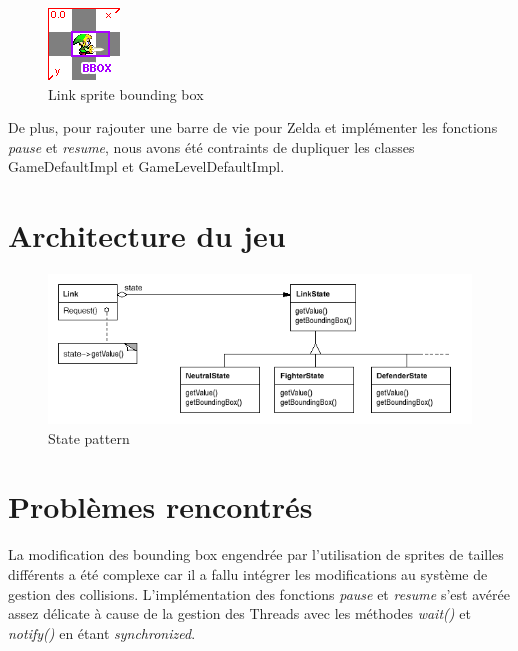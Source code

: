 \begin{figure}[ht!]
  \center
  \includegraphics{resources/bbox.png}
  \caption{Link sprite bounding box}
  \label{fig:Link sprite bounding box}
\end{figure}

De plus, pour rajouter une barre de vie pour Zelda et implémenter les fonctions
\emph{pause} et \emph{resume}, nous avons été contraints de dupliquer les
classes GameDefaultImpl et GameLevelDefaultImpl.


\section{Architecture du jeu}

\begin{figure}[ht!]
  \center
  \includegraphics[width=16cm,keepaspectratio]{resources/state_pattern.png}
  \caption{State pattern}
  \label{fig:State pattern}
\end{figure}


\section{Problèmes rencontrés}
La modification des bounding box engendrée par l'utilisation de sprites de
tailles différents a été complexe car il a fallu intégrer les modifications au
système de gestion des collisions.
L'implémentation des fonctions \emph{pause} et \emph{resume} s'est avérée assez
délicate à cause de la gestion des Threads avec les méthodes \emph{wait()} et
\emph{notify()} en étant \emph{synchronized}.
